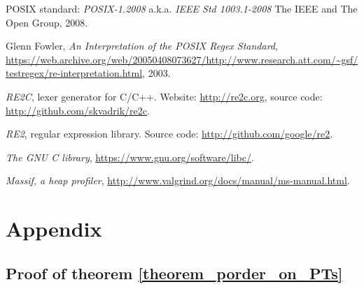 \documentclass[AMA,STIX1COL]{WileyNJD-v2}
\begin{document}
\begin{thebibliography}{99}
    POSIX standard: \textit{POSIX-1.2008}
    a.k.a. \textit{IEEE Std 1003.1-2008}
    The IEEE and The Open Group,
    2008.

    Glenn Fowler,
    \textit{An Interpretation of the POSIX Regex Standard},
    \url{https://web.archive.org/web/20050408073627/http://www.research.att.com/~gsf/testregex/re-interpretation.html},
    2003.

    \textit{RE2C}, lexer generator for C/C++.
    Website: \url{http://re2c.org},
    source code: \url{http://github.com/skvadrik/re2c}.

    \textit{RE2}, regular expression library.
    Source code: \url{http://github.com/google/re2}.

    \textit{The GNU C library},
    \url{https://www.gnu.org/software/libc/}.

    \textit{Massif, a heap profiler},
    \url{http://www.valgrind.org/docs/manual/ms-manual.html}.

\end{thebibliography}


\vfill\null
\clearpage


\section*{Appendix}

\subsection*{Proof of theorem \ref{theorem_porder_on_PTs}}
\end{document}
